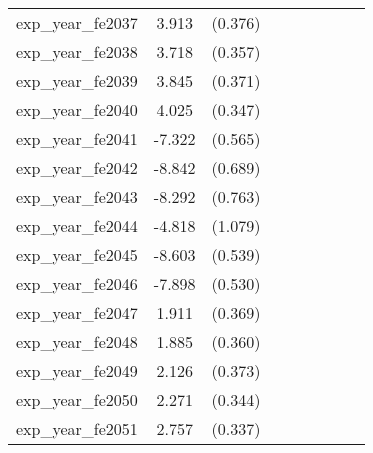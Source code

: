 {\begin{tabular}{l*{4}{cc}}
exp\_year\_fe2037&    3.913\sym{***}&  (0.376)&                  &         &                  &         &                  &         \\
exp\_year\_fe2038&    3.718\sym{***}&  (0.357)&                  &         &                  &         &                  &         \\
exp\_year\_fe2039&    3.845\sym{***}&  (0.371)&                  &         &                  &         &                  &         \\
exp\_year\_fe2040&    4.025\sym{***}&  (0.347)&                  &         &                  &         &                  &         \\
exp\_year\_fe2041&   -7.322\sym{***}&  (0.565)&                  &         &                  &         &                  &         \\
exp\_year\_fe2042&   -8.842\sym{***}&  (0.689)&                  &         &                  &         &                  &         \\
exp\_year\_fe2043&   -8.292\sym{***}&  (0.763)&                  &         &                  &         &                  &         \\
exp\_year\_fe2044&   -4.818\sym{***}&  (1.079)&                  &         &                  &         &                  &         \\
exp\_year\_fe2045&   -8.603\sym{***}&  (0.539)&                  &         &                  &         &                  &         \\
exp\_year\_fe2046&   -7.898\sym{***}&  (0.530)&                  &         &                  &         &                  &         \\
exp\_year\_fe2047&    1.911\sym{***}&  (0.369)&                  &         &                  &         &                  &         \\
exp\_year\_fe2048&    1.885\sym{***}&  (0.360)&                  &         &                  &         &                  &         \\
exp\_year\_fe2049&    2.126\sym{***}&  (0.373)&                  &         &                  &         &                  &         \\
exp\_year\_fe2050&    2.271\sym{***}&  (0.344)&                  &         &                  &         &                  &         \\
exp\_year\_fe2051&    2.757\sym{***}&  (0.337)&                  &         &                  &         &                  &         \\

\end{tabular}}
